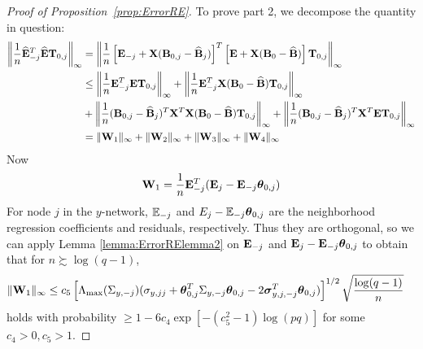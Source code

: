 \documentclass[12pt, letterpaper]{article}
\numberwithin{equation}{section}
\begin{document}
\begin{proof}[Proof of Proposition~\ref{prop:ErrorRE}]
To prove part 2, we decompose the quantity in question:
%
\begin{align}\label{eqn:ErrorRElemma2maineqn}
\left\| \frac{1}{n} \widehat {{\mathbf{E}}}_{-j}^T \widehat {{\mathbf{E}}} {\mathbf{T}}_{0,j} \right\|_\infty &=
\left\| \frac{1}{n} \left[ {\mathbf{E}}_{-j} + {\mathbf{X}} ({\mathbf{B}}_{0,j} - \widehat {{\mathbf{B}}}_j) \right]^T \left[ {\mathbf{E}} + {\mathbf{X}} ({\mathbf{B}}_0 - \widehat {{\mathbf{B}}}) \right] {\mathbf{T}}_{0,j} \right\|_\infty \notag\\
& \leq \left\| \frac{1}{n} {\mathbf{E}}_{-j}^T {\mathbf{E}} {\mathbf{T}}_{0,j} \right\|_\infty +
\left\| \frac{1}{n} {\mathbf{E}}_{-j}^T {\mathbf{X}} ({\mathbf{B}}_0 - \widehat {{\mathbf{B}}}) {\mathbf{T}}_{0,j} \right\|_\infty \notag\\
& + \left\| \frac{1}{n} ({\mathbf{B}}_{0,j} - \widehat {{\mathbf{B}}}_j)^T {\mathbf{X}}^T {\mathbf{X}} ({\mathbf{B}}_0 - \widehat {{\mathbf{B}}}) {\mathbf{T}}_{0,j} \right\|_\infty +
\left\| \frac{1}{n} ({\mathbf{B}}_{0,j} - \widehat {{\mathbf{B}}}_j)^T {\mathbf{X}}^T {\mathbf{E}} {\mathbf{T}}_{0,j} \right\|_\infty \notag\\
&= \| {\mathbf{W}}_1 \|_\infty + \| {\mathbf{W}}_2 \|_\infty + \| {\mathbf{W}}_3 \|_\infty + \| {\mathbf{W}}_4 \|_\infty
\end{align}
%
Now
%
$$
{\mathbf{W}}_1 = \frac{1}{n} {\mathbf{E}}_{-j}^T ( {\mathbf{E}}_j - {\mathbf{E}}_{-j} {\boldsymbol{\theta}}_{0,j})
$$
%
For node $j$ in the $y$-network, ${\mathbb{E}}_{-j}$ and $E_j - {\mathbb{E}}_{-j} {\boldsymbol{\theta}}_{0,j}$ are the neighborhood regression coefficients and residuals, respectively. Thus they are orthogonal, so we can apply Lemma \ref{lemma:ErrorRElemma2} on ${\mathbf{E}}_{-j}$ and ${\mathbf{E}}_j - {\mathbf{E}}_{-j} {\boldsymbol{\theta}}_{0,j}$ to obtain that for $n \succsim \log (q-1)$,
%
\begin{align}\label{eqn:ErrorRElemma2eqn5}
\| {\mathbf{W}}_1 \|_\infty & \leq c_5 \left[ \Lambda_{\max} ( \Sigma_{y,-j}) ( \sigma_{y,jj} + 
{\boldsymbol{\theta}}_{0,j}^T \Sigma_{y,-j} {\boldsymbol{\theta}}_{0,j} - 2 {\boldsymbol{\sigma}}_{y,j,-j}^T {\boldsymbol{\theta}}_{0,j} ) \right]^{1/2} \sqrt{\frac{\log(q-1)}{n}}
\end{align}
%
holds with probability $\geq 1 - 6c_4 \exp [-(c_5^2-1) \log(pq)]$ for some $c_4 > 0, c_5 > 1$.
%


\end{proof}
\end{document}

